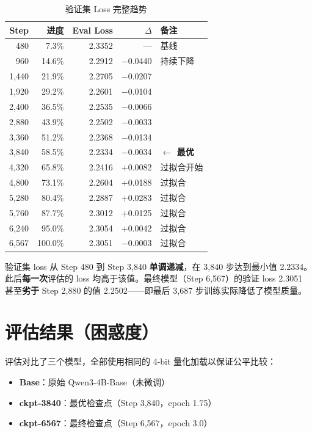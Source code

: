 \documentclass[12pt,a4paper]{ctexart}
\begin{document}
\begin{table}[htbp]\centering
\caption{验证集 Loss 完整趋势}
\begin{tabular}{@{}rrrrl@{}}
\toprule
\textbf{Step} & \textbf{进度} & \textbf{Eval Loss} & \textbf{$\Delta$} & \textbf{备注} \\
\midrule
480   & 7.3\%  & 2.3352 & ---      & 基线 \\
960   & 14.6\% & 2.2912 & $-$0.0440 & 持续下降 \\
1,440 & 21.9\% & 2.2705 & $-$0.0207 & \\
1,920 & 29.2\% & 2.2601 & $-$0.0104 & \\
2,400 & 36.5\% & 2.2535 & $-$0.0066 & \\
2,880 & 43.9\% & 2.2502 & $-$0.0033 & \\
3,360 & 51.2\% & 2.2368 & $-$0.0134 & \\
3,840 & 58.5\% & 2.2334 & $-$0.0034 & \textbf{$\leftarrow$ 最优} \\
4,320 & 65.8\% & 2.2416 & +0.0082  & 过拟合开始 \\
4,800 & 73.1\% & 2.2604 & +0.0188  & 过拟合 \\
5,280 & 80.4\% & 2.2887 & +0.0283  & 过拟合 \\
5,760 & 87.7\% & 2.3012 & +0.0125  & 过拟合 \\
6,240 & 95.0\% & 2.3054 & +0.0042  & 过拟合 \\
6,567 & 100.0\%& 2.3051 & $-$0.0003 & 过拟合 \\
\bottomrule
\end{tabular}
\end{table}

验证集 loss 从 Step 480 到 Step 3,840 \textbf{单调递减}，在 3,840 步达到最小值 2.2334。此后\textbf{每一次}评估的 loss 均高于该值。最终模型（Step 6,567）的验证 loss 2.3051 甚至\textbf{劣于} Step 2,880 的值 2.2502——即最后 3,687 步训练实际降低了模型质量。

\section{评估结果（困惑度）}

评估对比了三个模型，全部使用相同的 4-bit 量化加载以保证公平比较：
\begin{itemize}[nosep]
    \item \textbf{Base}：原始 Qwen3-4B-Base（未微调）
    \item \textbf{ckpt-3840}：最优检查点（Step 3,840，epoch 1.75）
    \item \textbf{ckpt-6567}：最终检查点（Step 6,567，epoch 3.0）
\end{itemize}
\end{document}
